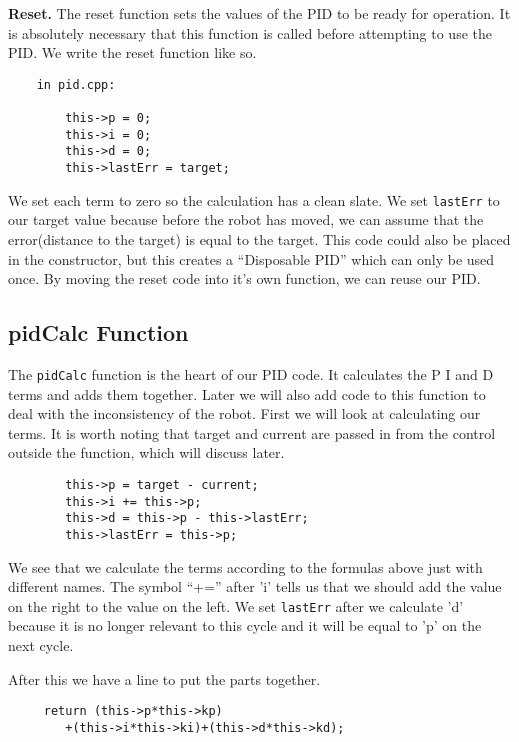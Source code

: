 \documentclass[12pt]{article}
\begin{document}
    \textbf{Reset.} The reset function sets the values of the PID to be ready for operation. It is absolutely necessary that this function is called before attempting to use the PID. We write the reset function like so.

    \begin{verbatim}
    in pid.cpp:

        this->p = 0;
        this->i = 0;
        this->d = 0;
        this->lastErr = target;
    \end{verbatim}

    We set each term to zero so the calculation has a clean slate. We set \verb|lastErr| to our target value because before the robot has moved, we can assume that the error(distance to the target) is equal to the target. This code could also be placed in the constructor, but this creates a ``Disposable PID'' which can only be used once. By moving the reset code into it's own function, we can reuse our PID.

\subsection{pidCalc Function}

    The \verb|pidCalc| function is the heart of our PID code. It calculates the P I and D terms and adds them together. Later we will also add code to this function to deal with the inconsistency of the robot. First we will look at calculating our terms. It is worth noting that target and current are passed in from the control outside the function, which will discuss later.
    \begin{verbatim}
        this->p = target - current;
        this->i += this->p;
        this->d = this->p - this->lastErr;
        this->lastErr = this->p;
    \end{verbatim}

    We see that we calculate the terms according to the formulas above just with different names. The symbol ``+='' after 'i' tells us that we should add the value on the right to the value on the left. We set \verb|lastErr| after we calculate 'd' because it is no longer relevant to this cycle and it will be equal to 'p' on the next cycle.

    After this we have a line to put the parts together.
    \begin{verbatim}
     return (this->p*this->kp)
        +(this->i*this->ki)+(this->d*this->kd);
    \end{verbatim}
\end{document}
